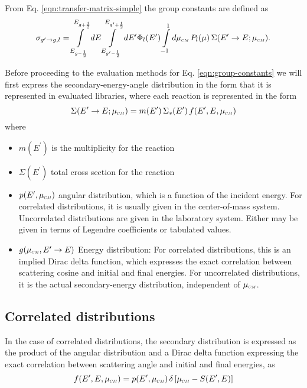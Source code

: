 \documentclass[../main.tex]{subfiles}
\begin{document}
From Eq. \eqref{eqn:transfer-matrix-simple} the group constants are defined as
\begin{equation} \label{eqn:group-constants}
  \sigma_{g^{\prime}\rightarrow g,l} = \int\limits_{E_{g-\frac{1}{2}}}^{E_{g+\frac{1}{2}}} dE \int\limits_{E_{g^{\prime}-\frac{1}{2}}}^{E_{g^{\prime}+\frac{1}{2}}} dE^{\prime} \Phi_l(E^{\prime}) \int\limits_{-1}^{1} d\mucm \, P_l(\mu) \, \Sigma(E^{\prime}\rightarrow E; \mucm).
\end{equation}

Before proceeding to the evaluation methods for Eq. \eqref{eqn:group-constants} we will first express the secondary-energy-angle distribution in the form that it is represented in evaluated libraries, where each reaction is represented in the form
\begin{equation}
  \Sigma(E^{\prime}\rightarrow E; \mucm) = m(E^{\prime}) \, \Sigma_s(E^{\prime}) \, f(E^{\prime},E,\mucm)
\end{equation}
where
\begin{itemize}
  \item $m(E^{\prime})$ is the multiplicity for the reaction
  \item $\Sigma(E^{\prime})$ total cross section for the reaction
  \item $p(E^{\prime},\mucm)$ angular distribution, which is a function of the incident energy. For correlated distributions, it is usually given in the center-of-mass system. Uncorrelated distributions are given in the laboratory system. Either may be given in terms of Legendre coefficients
  or tabulated values.
  \item $g(\mucm, E^{\prime}\rightarrow E)$ Energy distribution: For correlated distributions, this is an implied Dirac delta function, which expresses the exact correlation between scattering cosine and initial and final energies. For uncorrelated distributions, it is the actual secondary-energy
  distribution, independent of $\mucm$.
\end{itemize}


\subsection{Correlated distributions}
In the case of correlated distributions, the secondary distribution is expressed as the product of the angular distribution and a Dirac delta function expressing the exact correlation between scattering angle and initial and final energies, as
\begin{equation}
  f(E^{\prime},E,\mucm) = p(E^{\prime},\mucm) \, \delta\left[\mucm - S(E^{\prime},E)\right]
\end{equation}
\end{document}
